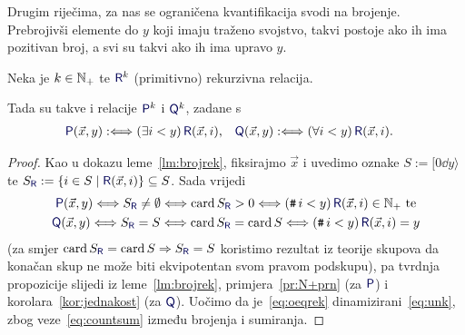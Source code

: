 Drugim riječima, za nas se ograničena kvantifikacija svodi na brojenje. Prebrojivši elemente do $y$ koji imaju traženo svojstvo, takvi postoje ako ih ima pozitivan broj, a svi su takvi ako ih ima upravo $y$.

\begin{propozicija}[{name=[ograničena kvantifikacija čuva (primitivnu) rekurzivnost]}]\label{prop:okvantrek}
Neka je $k\in{\mathbb N}_+$ te $\f R^k$ (primitivno) rekurzivna relacija.
	
	Tada su takve i relacije $\f P^k$ i $\f Q^k$, zadane s
\begin{align}
	\f P(\vec x,y)&:\Longleftrightarrow(\exists i<y)\,\f R(\vec x,i)\text,&
        \f Q(\vec x,y)&:\Longleftrightarrow(\forall i<y)\,\f R(\vec x,i)\text.
\end{align}
\end{propozicija}
\begin{proof}
    Kao u dokazu leme~\ref{lm:brojrek}, fiksirajmo $\vec x$ i uvedimo oznake $S:=[0\dd y\rangle$\newline te $S_{\f R}:=\{i\in S\mid\f R(\vec x,i)\}\subseteq S$. Sada vrijedi
\begin{gather}
\label{eq:oeqrek}\quad\f P(\vec x,y)\Longleftrightarrow S_{\f R}\ne\emptyset\Longleftrightarrow\card S_{\f R}>0\Longleftrightarrow(\num i<y)\,\f R(\vec x,i)\in\N_+\text{ te\quad}\\
\f Q(\vec x,y)\Longleftrightarrow S_{\f R}=S\Longleftrightarrow\card S_{\f R}=\card S\Longleftrightarrow(\num i<y)\,\f R(\vec x,i)\eq y
\end{gather}
	(za smjer $\card S_{\f R}=\card S\Rightarrow S_{\f R}=S$ koristimo rezultat iz teorije skupova da konačan skup ne može biti ekvipotentan svom pravom podskupu), pa tvrdnja propozicije slijedi iz leme~\ref{lm:brojrek}, primjera~\ref{pr:N+prn} (za $\f P$) i korolara~\ref{kor:jednakost} (za $\f Q$). Uočimo da je~\eqref{eq:oeqrek} dinamizirani~\eqref{eq:unk}, zbog veze~\eqref{eq:countsum} između brojenja i sumiranja.
\end{proof}

%

